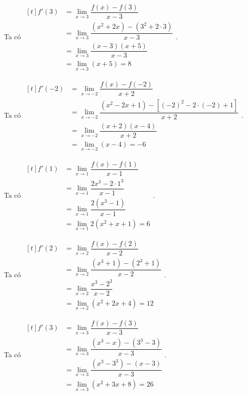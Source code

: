 \begin{vd}
{\begin{listEX}[2]
	Ta có 
	$\begin{aligned}[t]
	f'(3)
	&=\lim\limits_{x \to 3}\dfrac{f(x)-f(3)}{x-3}\\
	&=\lim\limits_{x \to 3}\dfrac{(x^2+2x)-(3^2+2\cdot 3)}{x-3}\\
	&=\lim\limits_{x \to 3}\dfrac{(x-3)(x+5)}{x-3}\\
	&=\lim\limits_{x \to 3}(x+5)=8
	\end{aligned}
	$.
	\item 
	Ta có 
	$\begin{aligned}[t]
	f'(-2)
	&=\lim\limits_{x \to -2}\dfrac{f(x)-f(-2)}{x+2}\\
	&=\lim\limits_{x \to -2}\dfrac{(x^2-2x+1)-\left[ (-2)^2-2\cdot(-2)+1\right]}{x+2}\\
	&=\lim\limits_{x \to -2}\dfrac{(x+2)(x-4)}{x+2}\\
	&=\lim\limits_{x \to -2}(x-4)=-6
	\end{aligned}
	$.
	\item 
	Ta có 
	$\begin{aligned}[t]
	f'(1)
	&=\lim\limits_{x \to 1}\dfrac{f(x)-f(1)}{x-1}\\
	&=\lim\limits_{x \to 1}\dfrac{2x^3-2\cdot 1^3}{x-1}\\
	&=\lim\limits_{x \to 1}\dfrac{2(x^3-1)}{x-1}\\
	&=\lim\limits_{x \to 1}2(x^2+x+1)=6
	\end{aligned}
	$.
	\item 
	Ta có 
	$\begin{aligned}[t]
	f'(2)
	&=\lim\limits_{x \to 2}\dfrac{f(x)-f(2)}{x-2}\\
	&=\lim\limits_{x \to 2}\dfrac{(x^3+1)-(2^3+1)}{x-2}\\
	&=\lim\limits_{x \to 2}\dfrac{x^3-2^3}{x-2}\\
	&=\lim\limits_{x \to 2}(x^2+2x+4)=12
	\end{aligned}
	$.
	\item 
	Ta có 
	$\begin{aligned}[t]
	f'(3)
	&=\lim\limits_{x \to 3}\dfrac{f(x)-f(3)}{x-3}\\
	&=\lim\limits_{x \to 3}\dfrac{(x^3-x)-(3^3-3)}{x-3}\\
	&=\lim\limits_{x \to 3}\dfrac{(x^3-3^3)-(x-3)}{x-3}\\
	&=\lim\limits_{x \to 3}(x^2+3x+8)=26
	\end{aligned}
	$.
	\end{listEX}
	}
\end{vd}
